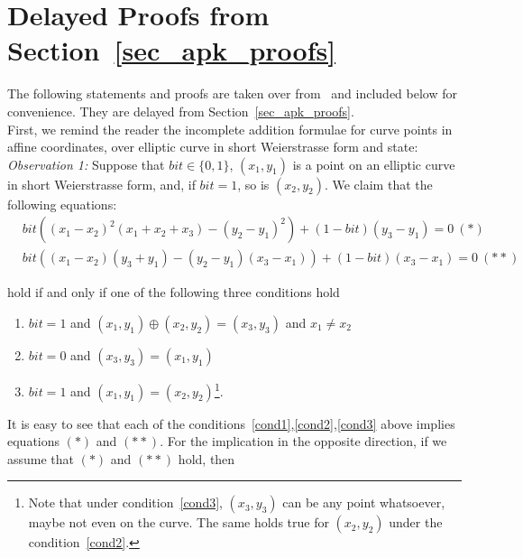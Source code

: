 \section{Delayed Proofs from Section~\ref{sec_apk_proofs}}
\label{sec:delayed}

The following statements and proofs are taken over from~\cite{LC_paper} and included below for convenience. They are delayed from Section~\ref{sec_apk_proofs}. \\


\noindent First, we remind the reader the incomplete addition formulae for curve points in affine coordinates, over elliptic curve in short Weierstrasse form and state:\\ 

\noindent \textit{Observation 1:} \label{obs} Suppose that $\mathit{bit} \in \{0,1\}$, $(x_1,y_1)$ is a point on an elliptic curve in 
short Weierstrasse form, and, if $\mathit{bit} = 1$, so is $(x_2,y_2)$. We claim that the following equations: 
\begin{align*}
&\mathit{bit}((x_1 - x_2)^2 (x_1 + x_2 + x_3) - (y_2 - y_1)^2 ) + (1 - \mathit{bit})(y_3 - y_1)  =0 \ (\ast)\\
&\mathit{bit}((x_1 - x_2)(y_3 + y_1) - (y_2 - y_1)(x_3 - x_1)) + (1 - \mathit{bit})(x_3 - x_1)  =0 \ (\ast\ast)
\end{align*}

\noindent hold if and only if one of the following three conditions hold 

\begin{enumerate}
\item \label{cond1} $\mathit{bit}=1$ and $(x_1,y_1)\oplus(x_2,y_2)=(x_3,y_3)$ and $x_1 \neq x_2$
\item \label{cond2} $\mathit{bit}=0$ and $(x_3,y_3)=(x_1,y_1)$ 
\item  \label{cond3} $\mathit{bit}=1$ and $(x_1,y_1)=(x_2,y_2)$\footnote{Note that under condition~\ref{cond3}, $(x_3,y_3)$ 
can be any point whatsoever, maybe not even on the curve. The same holds true for $(x_2, y_2)$ under the condition~\ref{cond2}.}.
\end{enumerate}

\noindent It is easy to see that each of the conditions~\ref{cond1},\ref{cond2},\ref{cond3} above implies equations $(\ast)$ and $(\ast \ast)$.
\noindent For the implication in the opposite direction, if we assume that $(\ast)$ and $(\ast \ast)$ hold, then \\
\vspace{-0.1in}

